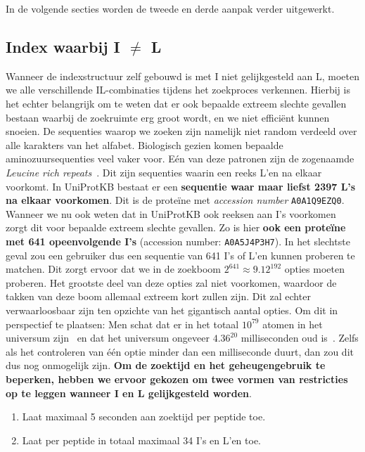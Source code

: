 In de volgende secties worden de tweede en derde aanpak verder uitgewerkt.

\subsection{Index waarbij I $\neq$ L}\label{subsec:index-waarbij-i-neq-l}
Wanneer de indexstructuur zelf gebouwd is met I niet gelijkgesteld aan L, moeten we alle verschillende IL-combinaties tijdens het zoekproces verkennen.
Hierbij is het echter belangrijk om te weten dat er ook bepaalde extreem slechte gevallen bestaan waarbij de zoekruimte erg groot wordt, en we niet efficiënt kunnen snoeien.
De sequenties waarop we zoeken zijn namelijk niet random verdeeld over alle karakters van het alfabet.
Biologisch gezien komen bepaalde aminozuursequenties veel vaker voor.
Eén van deze patronen zijn de zogenaamde \textit{Leucine rich repeats}~\cite{leucine_rich_repeats}.
Dit zijn sequenties waarin een reeks L'en na elkaar voorkomt.
In UniProtKB bestaat er een \textbf{sequentie waar maar liefst 2397 L's na elkaar voorkomen}.
Dit is de proteïne met \textit{accession number} \texttt{A0A1Q9EZQ0}.
Wanneer we nu ook weten dat in UniProtKB ook reeksen aan I's voorkomen zorgt dit voor bepaalde extreem slechte gevallen.
Zo is hier \textbf{ook een proteïne met 641 opeenvolgende I's} (accession number: \texttt{A0A5J4P3H7}).
In het slechtste geval zou een gebruiker dus een sequentie van 641 I's of L'en kunnen proberen te matchen.
Dit zorgt ervoor dat we in de zoekboom $2^{641} \approx 9.12^{192}$ opties moeten proberen.
Het grootste deel van deze opties zal niet voorkomen, waardoor de takken van deze boom allemaal extreem kort zullen zijn.
Dit zal echter verwaarloosbaar zijn ten opzichte van het gigantisch aantal opties.
Om dit in perspectief te plaatsen: Men schat dat er in het totaal $10^{79}$ atomen in het universum zijn~\cite{atoms_in_universe} en dat het universum ongeveer $4.36^{20}$ milliseconden oud is~\cite{age_universe}.
Zelfs als het controleren van één optie minder dan een milliseconde duurt, dan zou dit dus nog onmogelijk zijn.
\textbf{Om de zoektijd en het geheugengebruik te beperken, hebben we ervoor gekozen om twee vormen van restricties op te leggen wanneer I en L gelijkgesteld worden}.
\begin{enumerate}
    \item Laat maximaal 5 seconden aan zoektijd per peptide toe.
    \item Laat per peptide in totaal maximaal 34 I's en L'en toe.
\end{enumerate}
